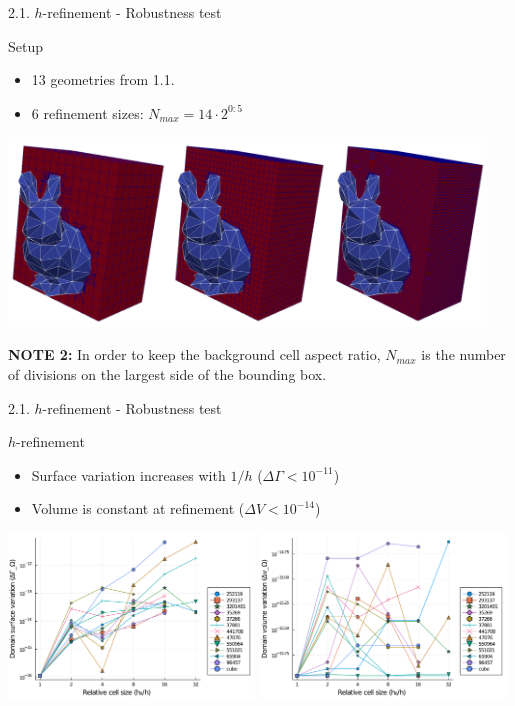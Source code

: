 \documentclass{beamer}
\begin{document}
\begin{frame}{2.1. $h$-refinement - Robustness test}
  \begin{block}{Setup}
    \begin{itemize}
      \item
        13 geometries from 1.1.
      \item
        6 refinement sizes: $N_{max} = 14 \cdot 2^{0:5}$
    \end{itemize}
  \end{block}

  \includegraphics[width=0.95\textwidth]{h_low_bunny}

 \textbf{NOTE 2:} In order to keep the background cell aspect ratio, $N_{max}$ is the number of divisions on the largest side of the bounding box.
\end{frame}


\begin{frame}{2.1. $h$-refinement - Robustness test}

  \begin{block}{$h$-refinement}
  \begin{itemize}
    \item
      Surface variation increases with $1/h$ ($\Delta \Gamma < 10^{-11}$)
    \item
      Volume is constant at refinement ($\Delta V < 10^{-14}$)
  \end{itemize}
  \end{block}

  \includegraphics[width=0.49\textwidth]{../analysis/plots/x_nmax_y_domain_surface}
  \includegraphics[width=0.49\textwidth]{../analysis/plots/x_nmax_y_domain_volume}
\end{frame}
\end{document}

